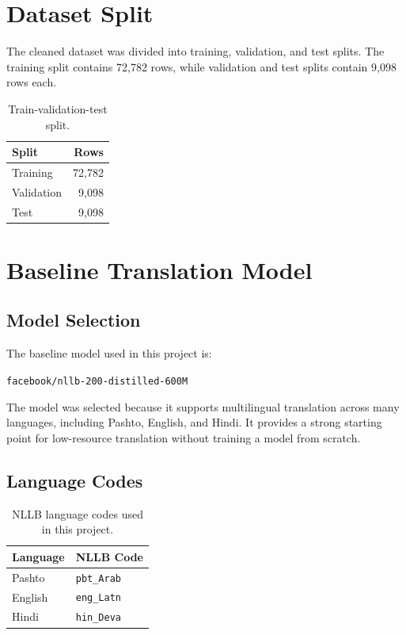 \documentclass[conference]{IEEEtran}
\begin{document}
\section{Dataset Split}

The cleaned dataset was divided into training, validation, and test splits. The training split contains 72,782 rows, while validation and test splits contain 9,098 rows each.

\begin{table}[H]
\centering
\caption{Train-validation-test split.}
\begin{tabular}{lr}
\toprule
\textbf{Split} & \textbf{Rows} \\
\midrule
Training & 72,782 \\
Validation & 9,098 \\
Test & 9,098 \\
\bottomrule
\end{tabular}
\end{table}

\section{Baseline Translation Model}

\subsection{Model Selection}

The baseline model used in this project is:

\begin{center}
\texttt{facebook/nllb-200-distilled-600M}
\end{center}

The model was selected because it supports multilingual translation across many languages, including Pashto, English, and Hindi. It provides a strong starting point for low-resource translation without training a model from scratch.

\subsection{Language Codes}

\begin{table}[H]
\centering
\caption{NLLB language codes used in this project.}
\begin{tabular}{ll}
\toprule
\textbf{Language} & \textbf{NLLB Code} \\
\midrule
Pashto & \texttt{pbt\_Arab} \\
English & \texttt{eng\_Latn} \\
Hindi & \texttt{hin\_Deva} \\
\bottomrule
\end{tabular}
\end{table}
\end{document}
